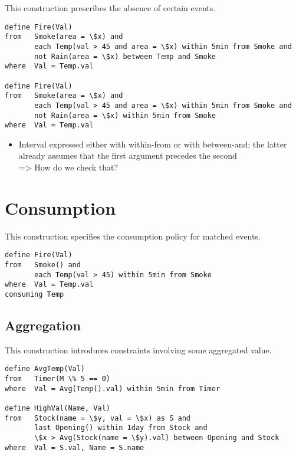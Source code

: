 This construction prescribes the absence of certain events.

\begin{lstlisting}[language=iotdsl]
define Fire(Val)
from   Smoke(area = \$x) and
       each Temp(val > 45 and area = \$x) within 5min from Smoke and
       not Rain(area = \$x) between Temp and Smoke
where  Val = Temp.val

define Fire(Val)
from   Smoke(area = \$x) and
       each Temp(val > 45 and area = \$x) within 5min from Smoke and
       not Rain(area = \$x) within 5min from Smoke
where  Val = Temp.val
\end{lstlisting}

\begin{itemize}
	\item Interval expressed either with within-from or with between-and; the
latter already assumes that the first argument precedes the second\\
=> How do we check that?
\end{itemize}

\section{Consumption}
\label{sec:Consumption}

This construction specifies the consumption policy for matched events.

\begin{lstlisting}[language=iotdsl]
define Fire(Val)
from   Smoke() and 
       each Temp(val > 45) within 5min from Smoke
where  Val = Temp.val
consuming Temp
\end{lstlisting}


\subsection{Aggregation}
\label{sec:Aggregation}

This construction introduces constraints involving some aggregated value.

\begin{lstlisting}[language=iotdsl]
define AvgTemp(Val)
from   Timer(M \% 5 == 0)
where  Val = Avg(Temp().val) within 5min from Timer

define HighVal(Name, Val)
from   Stock(name = \$y, val = \$x) as S and
       last Opening() within 1day from Stock and
       \$x > Avg(Stock(name = \$y).val) between Opening and Stock
where  Val = S.val, Name = S.name
\end{lstlisting}

